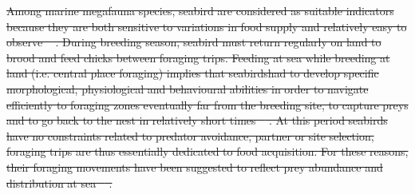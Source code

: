 \documentclass{article}
\providecommand{\DIFdeltex}[1]{{\protect\color{red}\sout{#1}}}                      %
\providecommand{\DIFdelbegin}{} %
\providecommand{\DIFdel}[1]{\texorpdfstring{\DIFdeltex{#1}}{}} %
\newcommand{\DIFscaledelfig}{0.5}
\newlength{\DIFdelgraphicswidth} %
\newlength{\DIFdelgraphicsheight} %
\newcommand{\DIFdelincludegraphics}[2][]{%
\sbox{\DIFdelgraphicsbox}{\DIFOincludegraphics[#1]{#2}}%
\settoboxwidth{\DIFdelgraphicswidth}{\DIFdelgraphicsbox} %
\settoboxtotalheight{\DIFdelgraphicsheight}{\DIFdelgraphicsbox} %
\scalebox{\DIFscaledelfig}{%
\parbox[b]{\DIFdelgraphicswidth}{\usebox{\DIFdelgraphicsbox}\\[-\baselineskip] \rule{\DIFdelgraphicswidth}{0em}}\llap{\resizebox{\DIFdelgraphicswidth}{\DIFdelgraphicsheight}{%
\setlength{\unitlength}{\DIFdelgraphicswidth}%
\begin{picture}(1,1)%
\thicklines\linethickness{2pt} %
{\color[rgb]{1,0,0}\put(0,0){\framebox(1,1){}}}%
{\color[rgb]{1,0,0}\put(0,0){\line( 1,1){1}}}%
{\color[rgb]{1,0,0}\put(0,1){\line(1,-1){1}}}%
\end{picture}%
}\hspace*{3pt}}} %
} %
\DeclareRobustCommand{\DIFdelbegin}{\DIFOdelbegin \let\includegraphics\DIFdelincludegraphics} %
\begin{document}
\DIFdelbegin \DIFdel{Among marine megafauna species, seabird are considered as suitable indicators because they are both sensitive to variations in food supply and relatively easy to observe \mbox{%
\cite{furness_seabirds_1997, wakefield_quantifying_2009}}\hspace{0pt}%
.
During breeding season, seabird must return regularly on land to brood and feed chicks between foraging trips.
Feeding at sea while breeding at land (i.e. central place foraging) implies  that seabirdshad to develop specific morphological, physiological and behavioural abilities in order to navigate efficiently to foraging zones eventually far from the breeding site, to capture preys and to go back to the nest in relatively short times \mbox{%
\cite{schreiber_biology_2001}}\hspace{0pt}%
. At this period seabirds have no constraints related to predator avoidance, partner or site selection, foraging trips are thus essentially dedicated to food acquisition. For these reasons, their foraging movements have been suggested to reflect prey abundance and distribution at sea \mbox{%
\cite{weimerskirch_are_2007}}\hspace{0pt}%
.
}%
\end{document}
